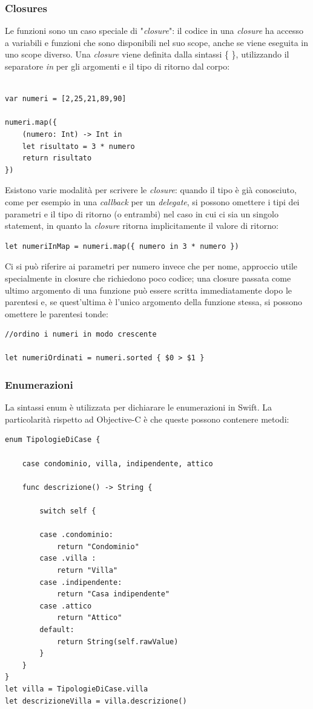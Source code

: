 \subsubsection{Closures}
Le funzioni sono un caso speciale di "\textit{closure}": il codice in una \textit{closure} ha accesso a variabili e funzioni che sono disponibili nel suo scope, anche se viene eseguita in uno scope diverso. Una \textit{closure} viene definita dalla sintassi \{ \}, utilizzando il separatore \textit{in} per gli argomenti e il tipo di ritorno dal corpo:\\\\ 
\lstset{language=[Objective]C, breakindent=40pt, breaklines}
\begin{lstlisting}
var numeri = [2,25,21,89,90]

numeri.map({
	(numero: Int) -> Int in 
	let risultato = 3 * numero 
	return risultato 
})
\end{lstlisting}
Esistono varie modalità per scrivere le \textit{closure}: quando il tipo è già conosciuto, come per esempio in una \textit{callback} per un \textit{delegate}, si possono omettere i tipi dei parametri e il tipo di ritorno (o entrambi) nel caso in cui ci sia un singolo statement, in quanto la \textit{closure} ritorna implicitamente il valore di ritorno:
\lstset{language=[Objective]C, breakindent=40pt, breaklines}
\begin{lstlisting}
let numeriInMap = numeri.map({ numero in 3 * numero })
\end{lstlisting}
Ci si può riferire ai parametri per numero invece che per nome, approccio utile specialmente in closure che richiedono poco codice; una closure passata come ultimo argomento di una funzione può essere scritta immediatamente dopo le parentesi e, se quest'ultima è l'unico argomento della funzione stessa, si possono omettere le parentesi tonde: 
\lstset{language=[Objective]C, breakindent=40pt, breaklines}
\begin{lstlisting}
//ordino i numeri in modo crescente

let numeriOrdinati = numeri.sorted { $0 > $1 }
\end{lstlisting}
\subsubsection{Enumerazioni}
La sintassi enum è utilizzata per dichiarare le enumerazioni in Swift. La particolarità rispetto ad Objective-C è che queste possono contenere metodi:
\lstset{language=[Objective]C, breakindent=40pt, breaklines}
\begin{lstlisting}
enum TipologieDiCase {

	case condominio, villa, indipendente, attico
	
	func descrizione() -> String {
	
		switch self {
	
		case .condominio:
			return "Condominio"
		case .villa :
			return "Villa"
		case .indipendente:
			return "Casa indipendente"
		case .attico
			return "Attico"
		default: 
			return String(self.rawValue)
		}
	}
}
let villa = TipologieDiCase.villa
let descrizioneVilla = villa.descrizione()
\end{lstlisting}
